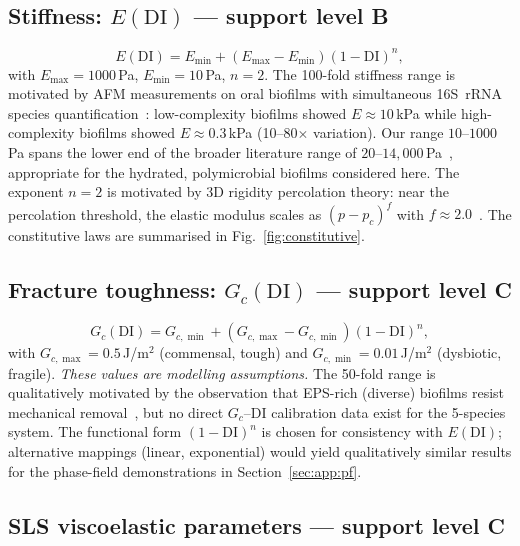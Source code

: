 \documentclass[smallextended]{svjour3}
\newcommand{\DI}{\mathrm{DI}}
\begin{document}
\subsection{Stiffness: $E(\DI)$ --- support level B}
\label{sec:const:E}

\begin{equation}
  E(\DI) = E_\min + (E_\max - E_\min)(1 - \DI)^n,
  \label{eq:E_DI}
\end{equation}
with $E_\max = 1000$\,Pa, $E_\min = 10$\,Pa, $n = 2$.
The 100-fold stiffness range is motivated by AFM measurements on oral
biofilms with simultaneous 16S~rRNA species
quantification~\cite{Pattem2018}: low-complexity biofilms showed
$E \approx 10$\,kPa while high-complexity biofilms showed
$E \approx 0.3$\,kPa (10--80$\times$ variation).
Our range $10$--$1000$\,Pa spans the lower end of the broader
literature range of $20$--$14{,}000$\,Pa~\cite{Pattem2021,Laspidou2014},
appropriate for the hydrated, polymicrobial biofilms considered here.
The exponent $n = 2$ is motivated by 3D rigidity percolation theory:
near the percolation threshold, the elastic modulus scales as
$(p - p_c)^f$ with $f \approx 2.0$~\cite{Sahimi1994,Arbabi1993}.
The constitutive laws are summarised in Fig.~\ref{fig:constitutive}.

\subsection{Fracture toughness: $G_c(\DI)$ --- support level C}
\label{sec:const:gc}

\begin{equation}
  G_c(\DI) = G_{c,\min} + (G_{c,\max} - G_{c,\min})(1 - \DI)^n,
  \label{eq:Gc_DI}
\end{equation}
with $G_{c,\max} = 0.5$\,J/m$^2$ (commensal, tough) and
$G_{c,\min} = 0.01$\,J/m$^2$ (dysbiotic, fragile).
\emph{These values are modelling assumptions.}
The 50-fold range is qualitatively motivated by the observation that
EPS-rich (diverse) biofilms resist mechanical
removal~\cite{Gloag2020a}, but no direct $G_c$--DI calibration data
exist for the 5-species system.
The functional form $(1-\DI)^n$ is chosen for consistency with
$E(\DI)$; alternative mappings (linear, exponential) would yield
qualitatively similar results for the phase-field demonstrations in
Section~\ref{sec:app:pf}.

\subsection{SLS viscoelastic parameters --- support level C}
\label{sec:const:sls}
\end{document}
